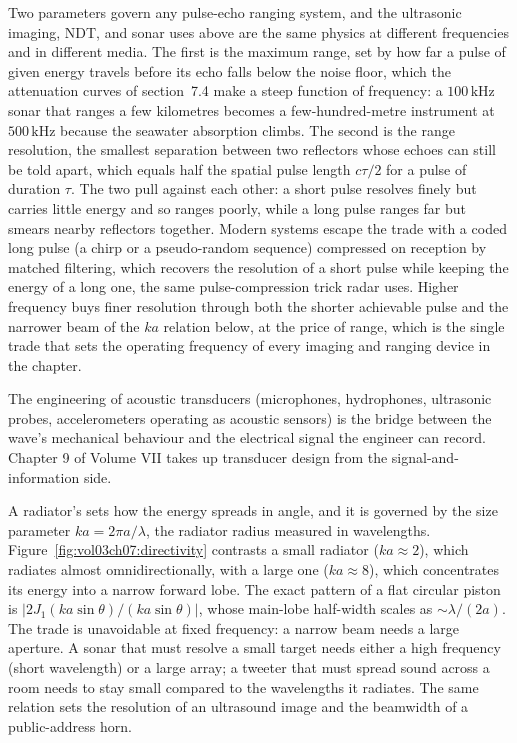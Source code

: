 Two parameters govern any pulse-echo ranging system, and the ultrasonic
imaging, NDT, and sonar uses above are the same physics at different
frequencies and in different media. The first is the maximum range, set by
how far a pulse of given energy travels before its echo falls below the
noise floor, which the attenuation curves of section~7.4 make a steep
function of frequency: a $100\,\si{\kilo\hertz}$ sonar that ranges a few
kilometres becomes a few-hundred-metre instrument at $500\,\si{\kilo\hertz}$
because the seawater absorption climbs. The second is the range resolution,
the smallest separation between two reflectors whose echoes can still be
told apart, which equals half the spatial pulse length $c\tau/2$ for a pulse
of duration $\tau$. The two pull against each other: a short pulse resolves
finely but carries little energy and so ranges poorly, while a long pulse
ranges far but smears nearby reflectors together. Modern systems escape the
trade with a coded long pulse (a chirp or a pseudo-random sequence)
compressed on reception by matched filtering, which recovers the resolution
of a short pulse while keeping the energy of a long one, the same
pulse-compression trick radar uses. Higher frequency buys finer resolution
through both the shorter achievable pulse and the narrower beam of the
$ka$ relation below, at the price of range, which is the single trade that
sets the operating frequency of every imaging and ranging device in the
chapter.

The engineering of acoustic transducers (microphones, hydrophones,
ultrasonic probes, accelerometers operating as acoustic sensors) is
the bridge between the wave's mechanical behaviour and the
electrical signal the engineer can record. Chapter 9 of Volume VII
takes up transducer design from the signal-and-information side.

A radiator's  sets how the energy spreads in
angle, and it is governed by the size parameter $ka = 2\pi a/\lambda$,
the radiator radius measured in wavelengths.
Figure~\ref{fig:vol03ch07:directivity} contrasts a small radiator
($ka\approx 2$), which radiates almost omnidirectionally, with a large
one ($ka\approx 8$), which concentrates its energy into a narrow
forward lobe. The exact pattern of a flat circular piston is
$|2J_1(ka\sin\theta)/(ka\sin\theta)|$, whose main-lobe half-width
scales as $\sim\lambda/(2a)$. The trade is unavoidable at fixed
frequency: a narrow beam needs a large aperture. A sonar that must
resolve a small target needs either a high frequency (short
wavelength) or a large array; a tweeter that must spread sound across
a room needs to stay small compared to the wavelengths it radiates.
The same relation sets the resolution of an ultrasound image and the
beamwidth of a public-address horn.

